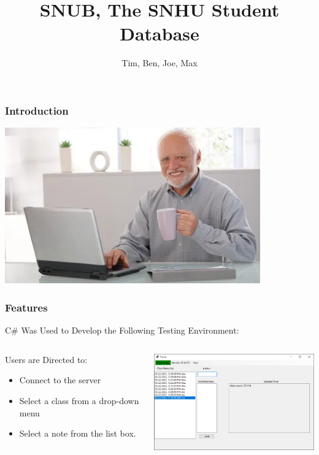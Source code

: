 \documentclass[aspectratio=169]{beamer}
\title{SNUB, The SNHU Student Database}
\author{Tim, Ben, Joe, Max}
\institute{SNHU CS-114}
\begin{document}
\frame{\titlepage} %

\begin{frame}
    \frametitle{Introduction}

    \begin{center}
     \includegraphics[width=11cm]{harold}
    \end{center}

\end{frame}

\begin{frame}
    \frametitle{Features}

    
    \begin{block}{\centering C\# Was Used to Develop the Following Testing Environment:}
    \end{block}
    \begin{columns}
        \begin{column}{0.3\textwidth}
            \begin{block}{Users are Directed to:}
            \begin{itemize}
                \item Connect to the server
                \item Select a class from a drop-down menu
                \item Select a note from the list box.
            \end{itemize}
            \end{block}
        \end{column}
        \begin{column}{0.48\textwidth}
            \includegraphics[width=8cm]{Sample_of_Features}
        \end{column}
    \end{columns}

\end{frame}
\end{document}
